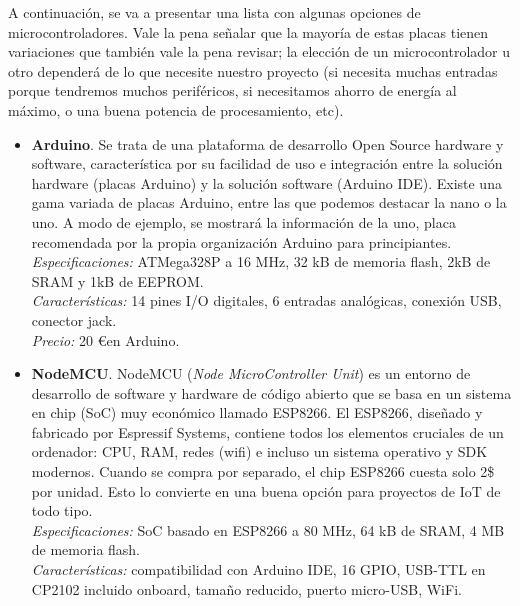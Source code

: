 \documentclass[12pt]{article}
\begin{document}
	\noindent A continuación, se va a presentar una lista con algunas opciones de microcontroladores. Vale la pena señalar que la mayoría de estas placas tienen variaciones que también vale la pena revisar; la elección de un microcontrolador u otro dependerá de lo que necesite nuestro proyecto (si necesita muchas entradas porque tendremos muchos periféricos, si necesitamos ahorro de energía al máximo, o una buena potencia de procesamiento, etc). \\
	
	\begin{itemize}
		\item \textbf{Arduino}. Se trata de una plataforma de desarrollo Open Source hardware y software, característica por su facilidad de uso e integración entre la solución hardware (placas Arduino) y la solución software (Arduino IDE). Existe una gama variada de placas Arduino, entre las que podemos destacar la nano o la uno. A modo de ejemplo, se mostrará la información de la uno, placa recomendada por la propia organización Arduino para principiantes.\\
		
		\textit{Especificaciones:} ATMega328P a 16 MHz, 32 kB de memoria flash, 2kB de SRAM y 1kB de EEPROM.\\
		
		\textit{Características:} 14 pines I/O digitales, 6 entradas analógicas, conexión USB, conector jack. \\
		
		\textit{Precio:} 20 \euro \enspace en Arduino.\\
		
		\item \textbf{NodeMCU}. NodeMCU (\textit{Node MicroController Unit}) es un entorno de desarrollo de software y hardware de código abierto que se basa en un sistema en chip (SoC) muy económico llamado ESP8266. El ESP8266, diseñado y fabricado por Espressif Systems, contiene todos los elementos cruciales de un ordenador: CPU, RAM, redes (wifi) e incluso un sistema operativo y SDK modernos. Cuando se compra por separado, el chip ESP8266 cuesta solo 2\$ por unidad. Esto lo convierte en una buena opción para proyectos de IoT de todo tipo. \\
		
		\textit{Especificaciones:} SoC basado en ESP8266 a 80 MHz, 64 kB de SRAM, 4 MB de memoria flash.\\ 
		
		\textit{Características:} compatibilidad con Arduino IDE, 16 GPIO, USB-TTL en CP2102 incluido onboard, tamaño reducido, puerto micro-USB, WiFi.\\
		

\end{itemize}
\end{document}
